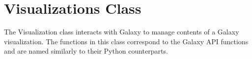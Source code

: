 \hypertarget{group__visualizations__class}{}\section{Visualizations Class}
\label{group__visualizations__class}
The Visualization class interacts with Galaxy to manage contents of a Galaxy visualization. The functions in this class correspond to the Galaxy A\+PI functions and are named similarly to their Python counterparts. 